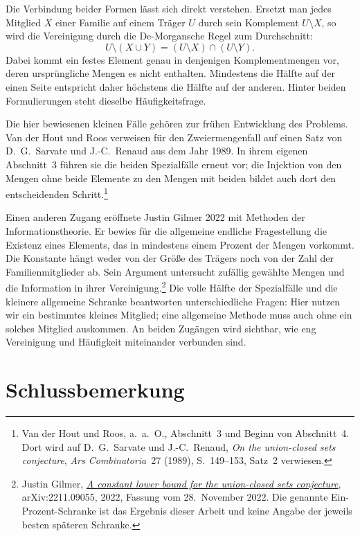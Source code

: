 Die Verbindung beider Formen lässt sich direkt verstehen.
Ersetzt man jedes Mitglied \(X\) einer Familie auf einem
Träger \(U\) durch sein Komplement \(U\setminus X\),
so wird die Vereinigung durch die De-Morgansche Regel zum
Durchschnitt:
\[
  U\setminus(X\cup Y)
    =(U\setminus X)\cap(U\setminus Y).
\]
Dabei kommt ein festes Element genau in denjenigen
Komplementmengen vor, deren ursprüngliche Mengen es nicht
enthalten. \glqq Mindestens die Hälfte\grqq{} auf der einen
Seite entspricht daher \glqq höchstens die Hälfte\grqq{}
auf der anderen. Hinter beiden Formulierungen steht dieselbe
Häufigkeitsfrage.

Die hier bewiesenen kleinen Fälle gehören zur frühen
Entwicklung des Problems. Van der Hout und Roos verweisen
für den Zweiermengenfall auf einen Satz von D.~G.~Sarvate
und J.-C.~Renaud aus dem Jahr 1989. In ihrem eigenen
Abschnitt~3 führen sie die beiden Spezialfälle erneut vor;
die Injektion von den Mengen ohne beide Elemente zu den
Mengen mit beiden bildet auch dort den entscheidenden
Schritt.\footnote{Van der Hout und Roos, a.~a.~O.,
Abschnitt~3 und Beginn von Abschnitt~4. Dort wird auf
D.~G.~Sarvate und J.-C.~Renaud, \emph{On the union-closed
sets conjecture}, \emph{Ars Combinatoria}~27 (1989),
S.~149--153, Satz~2 verwiesen.}

Einen anderen Zugang eröffnete Justin Gilmer 2022 mit
Methoden der Informationstheorie. Er bewies für die
allgemeine endliche Fragestellung die Existenz eines
Elements, das in mindestens einem Prozent der Mengen
vorkommt. Die Konstante hängt weder von der Größe des
Trägers noch von der Zahl der Familienmitglieder ab.
Sein Argument untersucht zufällig gewählte Mengen und
die Information in ihrer Vereinigung.\footnote{Justin Gilmer,
\href{https://arxiv.org/abs/2211.09055v2}{\emph{A constant lower bound for the union-closed sets conjecture}},
arXiv:2211.09055, 2022, Fassung vom 28.~November 2022.
Die genannte Ein-Prozent-Schranke ist das Ergebnis dieser
Arbeit und keine Angabe der jeweils besten späteren Schranke.}
Die volle Hälfte der Spezialfälle und die kleinere
allgemeine Schranke beantworten unterschiedliche Fragen:
Hier nutzen wir ein bestimmtes kleines Mitglied; eine
allgemeine Methode muss auch ohne ein solches Mitglied
auskommen. An beiden Zugängen wird sichtbar, wie eng
Vereinigung und Häufigkeit miteinander verbunden sind.

\par{}
\section*{Schlussbemerkung}
\hypertarget{frankl.reading.conclusion}{}

